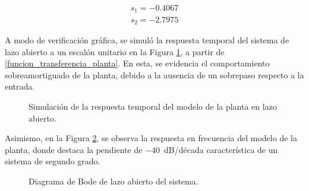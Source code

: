 \begin{equation} \label{polos}
    \begin{gathered}
        s_1= -0.4067 \\
        s_2= -2.7975
    \end{gathered}
\end{equation}

A modo de verificación gráfica, se simuló la respuesta temporal del sistema de lazo abierto a un escalón unitario en la Figura \ref{fig:respuesta-temporal-lazo-abierto}, a partir de \eqref{funcion_transferencia_planta}.
En esta, se evidencia el comportamiento sobreamortiguado de la planta, debido a la ausencia de un sobrepaso respecto a la entrada.

\begin{figure}[htbp]
    \centering
    \caption{Simulación de la respuesta temporal del modelo de la planta en lazo abierto.}
    \label{fig:respuesta-temporal-lazo-abierto}
\end{figure}

Asimismo, en la Figura \ref{fig:bode-lazo-abierto}, se observa la respuesta en frecuencia del modelo de la planta, donde destaca la pendiente de \SI{-40}{\deci\bel}/década característica de un sistema de segundo grado.

\begin{figure}[htbp]
    \centering
    \caption{Diagrama de Bode de lazo abierto del sistema.}
    \label{fig:bode-lazo-abierto}
\end{figure}

